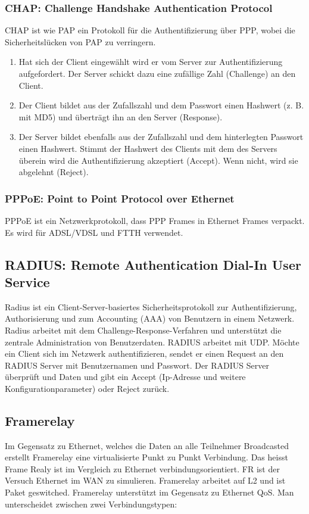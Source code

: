 \subsubsection{CHAP: Challenge Handshake Authentication Protocol}
CHAP ist wie PAP ein Protokoll für die Authentifizierung über PPP, wobei die Sicherheitslücken von PAP zu verringern.
\begin{enumerate}
	\item Hat sich der Client eingewählt wird er vom Server zur Authentifizierung aufgefordert. Der Server schickt dazu eine zufällige Zahl (Challenge) an den Client.
	\item Der Client bildet aus der Zufallszahl und dem Passwort einen Hashwert (z. B. mit MD5) und überträgt ihn an den Server (Response).
	\item Der Server bildet ebenfalls aus der Zufallszahl und dem hinterlegten Passwort einen Hashwert. Stimmt der Hashwert des Clients mit dem des Servers überein wird die Authentifizierung akzeptiert (Accept). Wenn nicht, wird sie abgelehnt (Reject).
\end{enumerate}

\subsubsection{PPPoE: Point to Point Protocol over Ethernet}
PPPoE ist ein Netzwerkprotokoll, dass PPP Frames in Ethernet Frames verpackt. Es wird für ADSL/VDSL und FTTH verwendet.

\subsection{RADIUS: Remote Authentication Dial-In User Service}
Radius ist ein Client-Server-basiertes Sicherheitsprotokoll zur Authentifizierung, Authorisierung und zum Accounting (AAA) von Benutzern in einem Netzwerk. Radius arbeitet mit dem Challenge-Response-Verfahren und unterstützt die zentrale Administration von Benutzerdaten. RADIUS arbeitet mit UDP. Möchte ein Client sich im Netzwerk authentifizieren, sendet er einen Request an den RADIUS Server mit Benutzernamen und Passwort. Der RADIUS Server überprüft und Daten und gibt ein Accept (Ip-Adresse und weitere Konfigurationparameter) oder Reject zurück.

\subsection{Framerelay}
Im Gegensatz zu Ethernet, welches die Daten an alle Teilnehmer Broadcasted erstellt Framerelay eine virtualisierte Punkt zu Punkt Verbindung. Das heisst Frame Realy ist im Vergleich zu Ethernet verbindungsorientiert. FR ist der Versuch Ethernet im WAN zu simulieren. Framerelay arbeitet auf L2 und ist Paket geswitched. Framerelay unterstützt im Gegensatz zu Ethernet QoS. Man unterscheidet zwischen zwei Verbindungstypen:

